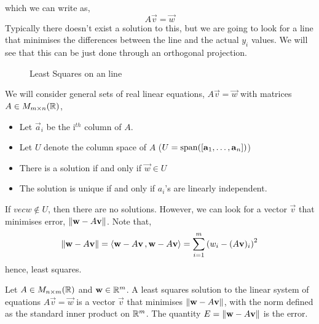 \documentclass{article}
\begin{document}
which we can write as,
$$ A\vec v = \vec w $$
Typically there doesn't exist a solution to this, but we are going to look for a line that minimises the differences between the line and the actual $y_i$ values. We will see that this can be just done through an orthogonal projection.

\begin{figure}[!ht]
  \centering
  \caption{Least Squares on an line}
  \label{fig:LeastSq}
\end{figure}

We will consider general sets of real linear equations, $A\vec v = \vec w$ with matrices $A \in M_{m\times n}(\mathbb{R})$,
\begin{itemize}
  \item Let $\vec a_i$ be the i$^{th}$ column of $A$.
  \item Let $U$ denote the column space of $A$ ($U = \operatorname{span} ([\boldsymbol{\mathbf{a}}_1, \dots, \boldsymbol{\mathbf{a}}_n])$)
  \item There is a solution if and only if $\vec w \in U$
  \item The solution is unique if and only if $a_i$'s are linearly independent.
\end{itemize}
If $vec w\notin U$, then there are no solutions. However, we can look for a vector $\vec v$ that minimises error, $\left\lVert \boldsymbol{\mathbf{w}} - A\boldsymbol{\mathbf{v}}\right\rVert$. Note that,
$$ \left\lVert \boldsymbol{\mathbf{w}} - A\boldsymbol{\mathbf{v}}\right\rVert = \left\langle \boldsymbol{\mathbf{w}} - A\boldsymbol{\mathbf{v}}\,, \boldsymbol{\mathbf{w}} - A\boldsymbol{\mathbf{v}} \right\rangle = \sum_{i=1}^m {(w_i - (A\boldsymbol{\mathbf{v}})_i)}^2 $$
hence, least squares.\\

\begin{ndefi}
  Let $A \in M_{n\times m}(\mathbb{R})$ and $\boldsymbol{\mathbf{w}}\in \mathbb{R}^m$. A least squares solution to the linear system of equations $A\vec v = \vec w$ is a vector $\vec v$ that minimises $\left\lVert \boldsymbol{\mathbf{w}} - A\boldsymbol{\mathbf{v}}\right\rVert$, with the norm defined as the standard inner product on $\mathbb{R}^m$. The quantity $E = \left\lVert \boldsymbol{\mathbf{w}} - A\boldsymbol{\mathbf{v}}\right\rVert$ is the error.
\end{ndefi}
\end{document}
